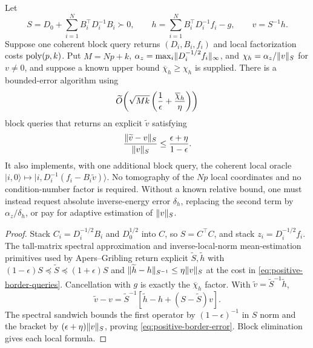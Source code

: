 \begin{theorem}
\label{thm:positive-border-module}
Let
\[
 S=D_0+\sum_{i=1}^NB_i^\top D_i^{-1}B_i\succ0,\qquad
 h=\sum_{i=1}^NB_i^\top D_i^{-1}f_i-g,\qquad v=S^{-1}h.
\]
Suppose one coherent block query returns $(D_i,B_i,f_i)$ and local
factorization costs $\operatorname{poly}(p,k)$.  Put $M=Np+k$,
$\alpha_z=\max_i\lVert D_i^{-1/2}f_i\rVert_\infty$, and
$\chi_h=\alpha_z/\lVert v\rVert_S$ for $v\ne0$, and suppose a known upper bound
$\overline\chi_h\geq\chi_h$ is supplied.  There is a bounded-error algorithm
using
\begin{equation}
 \widetilde{O}\!\left(\sqrt{Mk}\left(\frac{1}{\epsilon}
                   +\frac{\overline\chi_h}{\eta}\right)\right)    \label{eq:positive-border-queries}
\end{equation}
block queries that returns an explicit $\widetilde v$ satisfying
\begin{equation}
 \frac{\lVert\widetilde v-v\rVert_S}{\lVert v\rVert_S}
 \leq\frac{\epsilon+\eta}{1-\epsilon}.                 \label{eq:positive-border-error}
\end{equation}
It also implements, with one additional block query, the coherent local oracle
$|i,0\rangle\mapsto|i,D_i^{-1}(f_i-B_i\widetilde v)\rangle$.  No tomography
of the $Np$ local coordinates and no condition-number factor is required.
Without a known relative bound, one must instead request absolute inverse-energy
error $\delta_h$, replacing the second term by $\alpha_z/\delta_h$, or pay for
adaptive estimation of $\lVert v\rVert_S$.
\end{theorem}

\begin{proof}
Stack $C_i=D_i^{-1/2}B_i$ and $D_0^{1/2}$ into $C$, so $S=C^\top C$, and stack
$z_i=D_i^{-1/2}f_i$.  The tall-matrix spectral approximation and
inverse-local-norm mean-estimation primitives used by Apers--Gribling
\cite{apers2026-quantum-speedups-linear-programming-interior} return explicit
$\widetilde S,\widetilde h$ with
$(1-\epsilon)S\preceq\widetilde S\preceq(1+\epsilon)S$ and
$\lVert\widetilde h-h\rVert_{S^{-1}}\leq\eta\lVert v\rVert_S$ at the cost in
\eqref{eq:positive-border-queries}.  Cancellation with $g$ is exactly the
$\overline\chi_h$ factor.  With $\widetilde v=\widetilde S^{-1}\widetilde h$,
\[
 \widetilde v-v=\widetilde S^{-1}
 [\widetilde h-h+(S-\widetilde S)v].
\]
The spectral sandwich bounds the first operator by $(1-\epsilon)^{-1}$ in
$S$ norm and the bracket by $(\epsilon+\eta)\lVert v\rVert_S$, proving
\eqref{eq:positive-border-error}.  Block elimination gives each local formula.
\end{proof}

